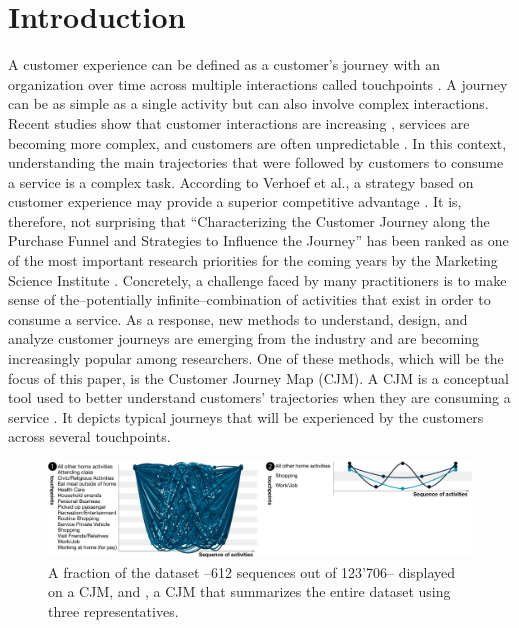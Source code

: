 \documentclass[runningheads]{llncs}
\begin{document}
\section{Introduction}
A customer experience can be defined as a customer's journey with an organization over time across multiple interactions called touchpoints \cite{lemon2016understanding}. A journey can be as simple as a single activity but can also involve complex interactions. Recent studies show that customer interactions are increasing \cite{how_to_improve}, services are becoming more complex, and customers are often unpredictable \cite{key_factors_in}. In this context, understanding the main trajectories that were followed by customers to consume a service is a complex task. According to Verhoef et al., a strategy based on customer experience may provide a superior competitive advantage \cite{lemon2016understanding}. It is, therefore, not surprising that ``Characterizing the Customer Journey along the Purchase Funnel and Strategies to Influence the Journey'' has been ranked as one of the most important research priorities for the coming years by the Marketing Science Institute  \cite{MSI2016}. Concretely, a challenge faced by many practitioners is to make sense of the–potentially infinite–combination of activities that exist in order to consume a service. As a response, new methods to understand, design, and analyze customer journeys are emerging from the industry and are becoming increasingly popular among researchers. One of these methods, which will be the focus of this paper, is the Customer Journey Map (CJM). A CJM is a conceptual tool used to better understand customers' trajectories when they are consuming a service \cite{bernard2017cjm}. It depicts typical journeys that will be experienced by the customers across several touchpoints. 

\begin{figure}[H]
\centering
\includegraphics[width=1\columnwidth]{05_schema/intro2.pdf}
\caption{ A fraction of the dataset --612 sequences out of 123'706-- displayed on a CJM, and , a CJM that summarizes the entire dataset using three representatives.}
\label{representativejourney}
\end{figure}
\end{document}

